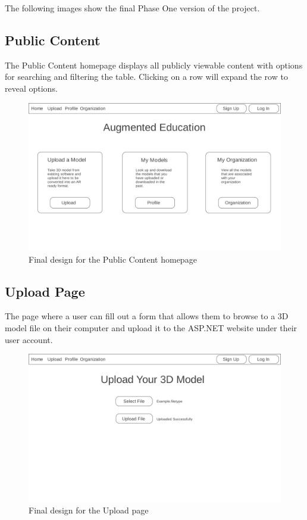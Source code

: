 \hspace{7mm}
The following images show the final Phase One version of the project. 
\subsection{Public Content}
    \hspace{7mm} The Public Content homepage displays all publicly viewable content with options for searching and filtering the table. Clicking on a row will expand the row to reveal options. 
    \label{fig:final_public_content_page}
    \begin{figure}[H]
        \centering \includegraphics[width=0.6\linewidth]{Home}
        \caption{Final design for the Public Content homepage}
    \end{figure}

\subsection{Upload Page}
    \hspace{7mm} The page where a user can fill out a form 
    that allows them to browse to a 3D model file on their computer and upload
    it to the ASP.NET website under their user account.
    \ \\
    \label{fig:final_upload_page}
    \begin{figure}[H]
        \centering \includegraphics[width=0.6\linewidth]{Upload}
        \caption{Final design for the Upload page}
    \end{figure}

